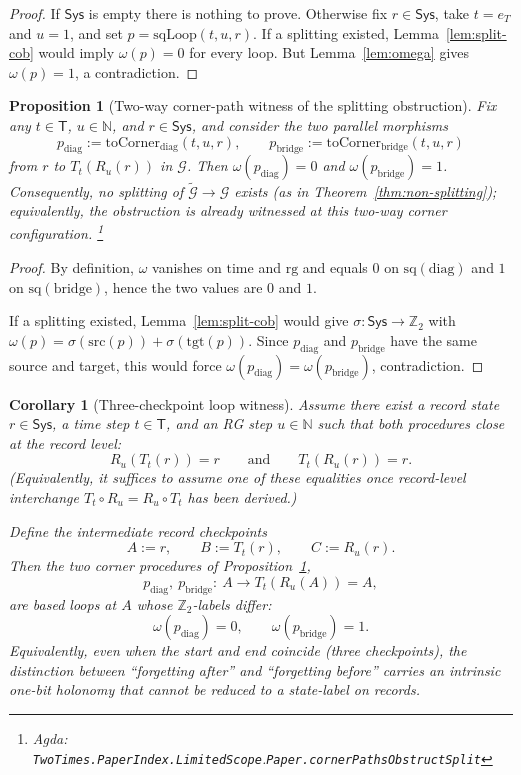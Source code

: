 \documentclass{article}
\newcommand{\Sys}{\mathsf{Sys}}
\newcommand{\Time}{\mathsf{T}}
\newcommand{\RG}{\mathbb{N}}
\newcommand{\Ztwo}{\mathbb{Z}_2}
\newcommand{\Agda}[1]{\texttt{#1}}
\newcommand{\AgdaRef}[2]{\emph{Agda: }\Agda{#1}.\Agda{#2}}
\newcommand{\AgdaNote}[2]{\footnote{\AgdaRef{#1}{#2}}}
\theoremstyle{definition}
\theoremstyle{plain}
\newtheorem{proposition}{Proposition}[section]
\newtheorem{corollary}{Corollary}[section]
\begin{document}
\begin{proof}
If $\Sys$ is empty there is nothing to prove. Otherwise fix $r\in\Sys$, take $t=e_T$
and $u=1$, and set $p=\mathrm{sqLoop}(t,u,r)$. If a splitting existed,
Lemma~\ref{lem:split-cob} would imply $\omega(p)=0$ for every loop.
But Lemma~\ref{lem:omega} gives $\omega(p)=1$, a contradiction.
\end{proof}

\begin{proposition}[Two-way corner-path witness of the splitting obstruction]
\label{prop:two-way-obstruction}
Fix any $t\in\Time$, $u\in\RG$, and $r\in\Sys$, and consider the two parallel morphisms
\[
p_{\mathrm{diag}}:=\mathrm{toCorner}_{\mathrm{diag}}(t,u,r),\qquad
p_{\mathrm{bridge}}:=\mathrm{toCorner}_{\mathrm{bridge}}(t,u,r)
\]
from $r$ to $T_t(R_u(r))$ in $\mathcal G$.
Then $\omega(p_{\mathrm{diag}})=0$ and $\omega(p_{\mathrm{bridge}})=1$.
Consequently, no splitting of $\widetilde{\mathcal G}\to\mathcal G$ exists (as in Theorem~\ref{thm:non-splitting});
equivalently, the obstruction is already witnessed at this two-way corner configuration.
\AgdaNote{TwoTimes.PaperIndex.LimitedScope}{Paper.cornerPathsObstructSplit}
\end{proposition}

\begin{proof}
By definition, $\omega$ vanishes on $\mathrm{time}$ and $\mathrm{rg}$ and equals $0$ on $\mathrm{sq}(\mathrm{diag})$
and $1$ on $\mathrm{sq}(\mathrm{bridge})$, hence the two values are $0$ and $1$.

If a splitting existed, Lemma~\ref{lem:split-cob} would give $\sigma:\Sys\to\Ztwo$ with
$\omega(p)=\sigma(\mathrm{src}(p))+\sigma(\mathrm{tgt}(p))$. Since $p_{\mathrm{diag}}$ and $p_{\mathrm{bridge}}$
have the same source and target, this would force $\omega(p_{\mathrm{diag}})=\omega(p_{\mathrm{bridge}})$, contradiction.
\end{proof}

\begin{corollary}[Three-checkpoint loop witness]
\label{cor:groundhog-loop}
Assume there exist a record state $r\in\Sys$, a time step $t\in\Time$, and an RG step
$u\in\RG$ such that both procedures close at the record level:
\[
R_u(T_t(r))=r
\qquad\text{and}\qquad
T_t(R_u(r))=r.
\]
(Equivalently, it suffices to assume one of these equalities once record-level
interchange $T_t\!\circ R_u = R_u\!\circ T_t$ has been derived.)

Define the intermediate record checkpoints
\[
A:=r,\qquad B:=T_t(r),\qquad C:=R_u(r).
\]
Then the two corner procedures of Proposition~\ref{prop:two-way-obstruction},
\[
p_{\mathrm{diag}},\ p_{\mathrm{bridge}}:\ A\longrightarrow T_t(R_u(A))=A,
\]
are based loops at $A$ whose $\Ztwo$-labels differ:
\[
\omega(p_{\mathrm{diag}})=0,\qquad \omega(p_{\mathrm{bridge}})=1.
\]
Equivalently, even when the start and end coincide (three checkpoints), the distinction
between ``forgetting after'' and ``forgetting before'' carries an intrinsic one-bit holonomy
that cannot be reduced to a state-label on records.
\end{corollary}
\end{document}
